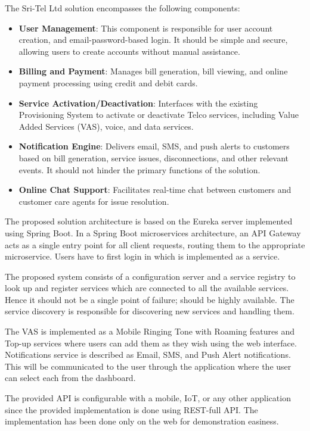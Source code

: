 \documentclass[12pt]{article}
\begin{document}
The Sri-Tel Ltd solution encompasses the following components:
\begin{itemize}
    \item \textbf{User Management}: This component is responsible for user account creation, and email-password-based login. It should be simple and secure, allowing users to create accounts without manual assistance.
    \item \textbf{Billing and Payment}: Manages bill generation, bill viewing, and online payment processing using credit and debit cards.
    \item \textbf{Service Activation/Deactivation}: Interfaces with the existing Provisioning System to activate or deactivate Telco services, including Value Added Services (VAS), voice, and data services.
    \item \textbf{Notification Engine}: Delivers email, SMS, and push alerts to customers based on bill generation, service issues, disconnections, and other relevant events. It should not hinder the primary functions of the solution.
    \item \textbf{Online Chat Support}: Facilitates real-time chat between customers and customer care agents for issue resolution. 
\end{itemize}

\par The proposed solution architecture is based on the Eureka server implemented using Spring Boot. In a Spring Boot microservices architecture, an API Gateway acts as a single entry point for all client requests, routing them to the appropriate microservice. Users have to first login in which is implemented as a service. 

\par The proposed system consists of a configuration server and a service registry to look up and register services which are connected to all the available services. Hence it should not be a single point of failure; should be highly available. The service discovery is responsible for discovering new services and handling them. 

\par The VAS is implemented as a Mobile Ringing Tone with Roaming features and Top-up services where users can add them as they wish using the web interface. Notifications service is described as Email, SMS, and Push Alert notifications. This will be communicated to the user through the application where the user can select each from the dashboard.

\par The provided API is configurable with a mobile, IoT, or any other application since the provided implementation is done using REST-full API. The implementation has been done only on the web for demonstration easiness.
\end{document}
